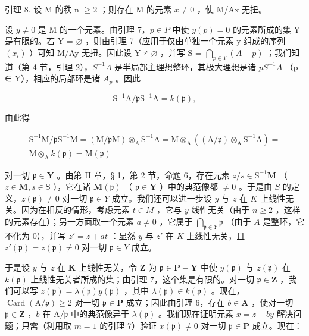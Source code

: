 引理 8. 设 M 的秩 n \(\geqslant2\) ；则存在 M 的元素 \(x \neq 0\) ，使 M/Ax 无扭。

设 \(y \neq 0\) 是 M 的一个元素。由引理 7，\(p \in P\) 中使 \(y(p) = 0\) 的元素所成的集 Y 是有限的。若 Y = \(\varnothing\) ，则由引理 7（应用于仅由单独一个元素 y 组成的序列 \((x_i)\) ）可知 M/Ay 无扭。因此设 Y ≠ \(\varnothing\) ，并写 S = \(\bigcap_{p \in Y} (A - p)\) ；我们知道（第 4 节，引理 2），\(S^{-1}A\) 是半局部主理想整环，其极大理想是诸 \(pS^{-1}A\) （p ∈ Y），相应的局部环是诸 \(A_{p}\) 。因此

\[
\mathrm{S} ^ {- 1} \mathrm{A} / \mathfrak {p} \mathrm{S} ^ {- 1} \mathrm{A} = k (\mathfrak {p}),
\]

由此得

\[
\begin{array}{c} \mathrm{S} ^ {- 1} \mathrm{M} / \mathfrak {p} \mathrm{S} ^ {- 1} \mathrm{M} = (\mathrm{M} / \mathfrak {p} \mathrm{M}) \otimes_ {\mathrm{A}} \mathrm{S} ^ {- 1} \mathrm{A} = \mathrm{M} \otimes_ {\mathrm{A}} ((\mathrm{A} / \mathfrak {p}) \otimes_ {\mathrm{A}} \mathrm{S} ^ {- 1} \mathrm{A}) = \\ \mathrm{M} \otimes_ {\mathrm{A}} k (\mathfrak {p}) = \mathrm{M} (\mathfrak {p}) \end{array}
\]

对一切 \(\mathfrak{p} \in \mathbf{Y}\) 。由第 II 章，§ 1，第 2 节，命题 6，存在元素 \(z / s \in \mathrm{S}^{-1}\mathbf{M}\) （ \(z \in \mathbf{M}, s \in \mathrm{S}\) ），它在诸 \(\mathbf{M}(\mathfrak{p})\) （ \(\mathfrak{p} \in \mathbf{Y}\) ）中的典范像都 \(\neq 0\) 。于是由 \(S\) 的定义，\(z(\mathfrak{p}) \neq 0\) 对一切 \(\mathfrak{p} \in Y\) 成立。我们还可以进一步设 \(y\) 与 \(z\) 在 \(K\) 上线性无关。因为在相反的情形，考虑元素 \(t \in M\) ，它与 \(y\) 线性无关（由于 \(n \geqslant 2\) ，这样的元素存在）；另一方面取一个元素 \(a \neq 0\) ，它属于 \(\bigcap_{\mathfrak{p} \in Y} \mathfrak{p}\) （由于 \(A\) 是整环，它不化为 0），并写 \(z' = z + at\) ：显然 \(y\) 与 \(z'\) 在 \(K\) 上线性无关，且 \(z'(\mathfrak{p}) = z(\mathfrak{p}) \neq 0\) 对一切 \(\mathfrak{p} \in Y\) 成立。

于是设 \(y\) 与 \(z\) 在 \(\mathbf{K}\) 上线性无关，令 \(\mathbf{Z}\) 为 \(\mathfrak{p} \in \mathbf{P} - \mathbf{Y}\) 中使 \(y(\mathfrak{p})\) 与 \(z(\mathfrak{p})\) 在 \(k(\mathfrak{p})\) 上线性无关者所成的集；由引理 7，这个集是有限的。对一切 \(\mathfrak{p} \in \mathbf{Z}\) ，我们可以写 \(z(\mathfrak{p}) = \lambda(\mathfrak{p})y(\mathfrak{p})\) ，其中 \(\lambda(\mathfrak{p}) \in k(\mathfrak{p})\) 。现在，\(\operatorname{Card}(\mathrm{A}/\mathfrak{p}) \geqslant 2\) 对一切 \(\mathfrak{p} \in \mathbf{P}\) 成立；因此由引理 6，存在 \(b \in \mathbf{A}\) ，使对一切 \(\mathfrak{p} \in \mathbf{Z}\) ，\(b\) 在 \(\mathrm{A}/\mathfrak{p}\) 中的典范像异于 \(\lambda(\mathfrak{p})\) 。我们现在证明元素 \(x = z - by\) 解决问题；只需（利用取 \(m = 1\) 的引理 7）验证 \(x(\mathfrak{p}) \neq 0\) 对一切 \(\mathfrak{p} \in \mathbf{P}\) 成立。现在：

